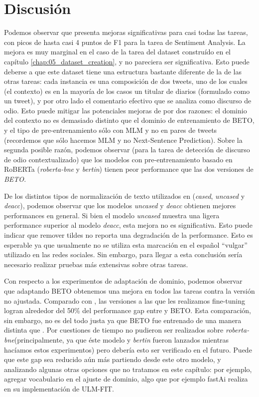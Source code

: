 \section{Discusión}

Podemos observar que \robertuito{} presenta mejoras significativas para casi todas las tareas, con picos de hasta casi 4 puntos de F1 para la tarea de Sentiment Analysis. La mejora es muy marginal en el caso de la tarea del dataset construído en el capítulo \ref{chap:05_dataset_creation}, y no pareciera ser significativa. Esto puede deberse a que este dataset tiene una estructura bastante diferente de la de las otras tareas: cada instancia es una composición de dos tweets, uno de los cuales (el contexto) es en la mayoría de los casos un titular de diarios (formulado como un tweet), y por otro lado el comentario efectivo que se analiza como discurso de odio. Esto puede mitigar las potenciales mejoras de \robertuito{} por dos razones: el dominio del contexto no es demasiado distinto que el dominio de entrenamiento de BETO, y el tipo de pre-entrenamiento sólo con MLM y no en pares de tweets (recordemos que sólo hacemos MLM y no Next-Sentence Prediction). Sobre la segunda posible razón, podemos observar (para la tarea de detección de discurso de odio contextualizado) que los modelos con pre-entrenamiento basado en RoBERTa (\emph{roberta-bne} y \emph{bertin}) tienen peor performance que las dos versiones de \emph{BETO}.

De los distintos tipos de normalización de texto utilizados en \robertuito{} (\emph{cased}, \emph{uncased} y \emph{deacc}), podemos observar que los modelos \emph{uncased} y \emph{deacc} obtienen mejores performances en general. Si bien el modelo \emph{uncased} muestra una ligera performance superior al modelo \emph{deacc}, esta mejora no es significativa. Esto puede indicar que remover tildes no reporta una degradación de la performance. Esto es esperable ya que usualmente no se utiliza esta marcación en el español ``vulgar'' utilizado en las redes sociales. Sin embargo, para llegar a esta conclusión sería necesario realizar pruebas más extensivas sobre otras tareas.

Con respecto a los experimentos de adaptación de dominio, podemos observar que adaptando BETO obtenemos una mejora en todos las tareas contra la versión no ajustada. Comparado con \robertuito{}, las versiones a las que les realizamos fine-tuning logran alrededor del 50\% del performance gap entre \robertuito{} y BETO. Esta comparación, sin embargo, no es del todo justa ya que BETO fue entrenado de una manera distinta que \robertuito{}. Por cuestiones de tiempo no pudieron ser realizados sobre \emph{roberta-bne}(principalmente, ya que éste modelo y \emph{bertin} fueron lanzados mientras hacíamos estos experimentos) pero debería esto ser verificado en el futuro. Puede que este gap sea reducido aún más partiendo desde este otro modelo, y analizando algunas otras opciones que no tratamos en este capítulo: por ejemplo, agregar vocabulario en el ajuste de dominio, algo que por ejemplo fastAi realiza en su implementación de ULM-FIT.

